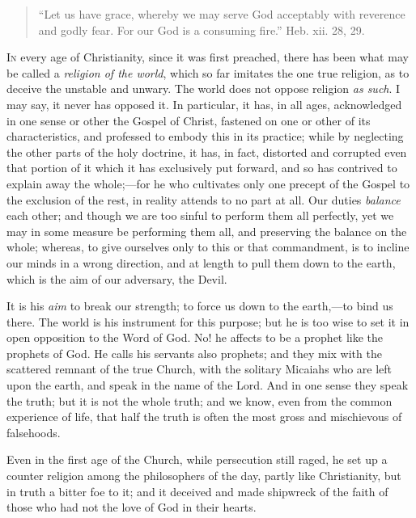 \begin{quote}

``Let us have grace, whereby we may serve God
acceptably with reverence and godly fear. For our God
is a consuming fire.'' Heb. xii. 28, 29.

\end{quote}

I\textsc{n} every age of Christianity, since it was first
preached, there has been what may be called a \emph{religion
of the world}, which so far imitates the one true
religion, as to deceive the unstable and unwary. The
world does not oppose religion \emph{as such}. I may
say, it never has opposed it. In particular, it has, in
all ages, acknowledged in one sense or other the Gospel
of Christ, fastened on one or other of its
characteristics, and professed to embody this in its
practice; while by neglecting the other parts of the holy
doctrine, it has, in fact, distorted and corrupted even
that portion of it which it has exclusively put forward,
and so has contrived to explain away the whole;—for
he who cultivates only one precept of the Gospel to the
exclusion of the rest, in reality attends to no part at
all. Our duties \emph{balance} each other; and though we
are too sinful to perform them all perfectly, yet we may
in some measure be performing them all, and preserving
the balance on the whole; whereas, to give ourselves only
to this or that commandment, is to incline our minds in a
wrong direction, and at length to pull them down to the
earth, which is the aim of our adversary, the Devil.

It is his \emph{aim} to break our strength; to force
us down to the earth,—to bind us there. The world is
his instrument for this purpose; but he is too wise to
set it in open opposition to the Word of God. No! he
affects to be a prophet like the prophets of God. He
calls his servants also prophets; and they mix with the
scattered remnant of the true Church, with the solitary
Micaiahs who are left upon the earth, and speak in the
name of the Lord. And in one sense they speak the truth;
but it is not the whole truth; and we know, even from the
common experience of life, that half the truth is often
the most gross and mischievous of falsehoods.

Even in the first age of the Church, while persecution
still raged, he set up a counter religion among the
philosophers of the day, partly like Christianity, but in
truth a bitter foe to it; and it deceived and made
shipwreck of the faith of those who had not the love of
God in their hearts.

